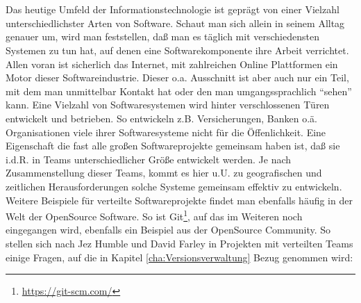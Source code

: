 \chapter{\preamble}
\label{cha:preamble}
Das heutige Umfeld der Informationstechnologie ist gepr\"agt von einer Vielzahl
unterschiedlichster Arten von Software. Schaut man sich allein in seinem Alltag
genauer um, wird man feststellen, daß man es täglich mit verschiedensten
Systemen zu tun hat, auf denen eine Softwarekomponente ihre Arbeit verrichtet.
Allen voran ist sicherlich das Internet, mit zahlreichen Online Plattformen ein
Motor dieser Softwareindustrie. Dieser o.a. Ausschnitt ist aber auch nur ein
Teil, mit dem man unmittelbar Kontakt hat oder den man umgangssprachlich
"`sehen"' kann.  Eine Vielzahl von Softwaresystemen wird hinter verschlossenen
T\"uren entwickelt und betrieben. So entwickeln z.B.  Versicherungen, Banken
o.\"a.  Organisationen viele ihrer Softwaresysteme nicht f\"ur die
\"Offenlichkeit. Eine Eigenschaft die fast alle gro\ss{}en Softwareprojekte
gemeinsam haben ist, daß sie i.d.R. in Teams unterschiedlicher Gr\"o\ss{}e
entwickelt werden. Je nach Zusammenstellung dieser Teams, kommt es hier u.U. zu
geografischen und zeitlichen Herausforderungen solche Systeme gemeinsam
effektiv zu entwickeln.  Weitere Beispiele f\"ur verteilte Softwareprojekte
findet man ebenfalls h\"aufig in der Welt der \gls{OpenSource} Software. So ist
Git\footnote{\label{git:1}\url{https://git-scm.com/}}, auf das im Weiteren noch
eingegangen wird, ebenfalls ein Beispiel aus der \gls{OpenSource} Community. So
stellen sich nach Jez Humble und David Farley in Projekten mit verteilten Teams
einige Fragen, auf die in Kapitel \ref{cha:Versionsverwaltung} Bezug genommen
wird\cite[S.~26, 33]{cd}:
